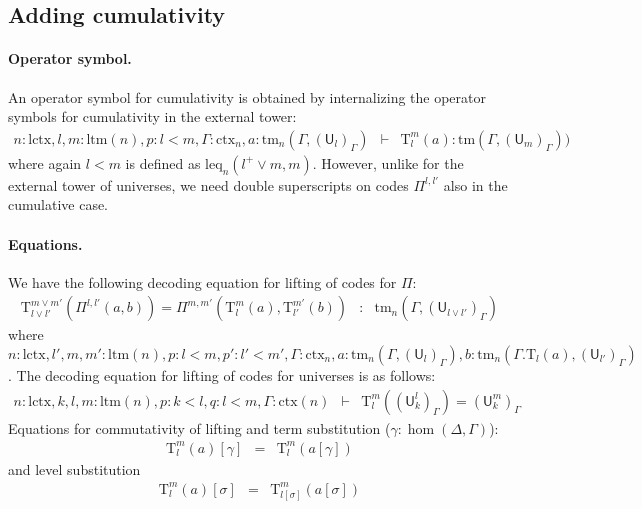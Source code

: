 \documentclass[11pt,a4paper]{article}
\theoremstyle{definition}
\newcommand{\UU}{\mathsf{U}}
\def\UU{\mathsf{U}}
\newcommand{\N}{\mathsf{N}}
\def\lctx{\mathrm{lctx}}
\def\ltm{\mathrm{ltm}}
\def\leq{\mathrm{leq}}
\newcommand{\ctx}{\mathrm{ctx}}
\newcommand{\tm}{\mathrm{tm}}
\def\U{\mathsf{U}}
\newcommand{\Ta}{\mathrm{T}}
\begin{document}
\subsection{Adding cumulativity} 
\paragraph{Operator symbol.}
An operator symbol for cumulativity is obtained by internalizing the operator symbols for cumulativity in the external tower:
\begin{eqnarray*}
n : \lctx, l,m : \ltm(n), p : l < m, \Gamma : \ctx_n, a : \tm_n(\Gamma,(\U_{l})_\Gamma) &\vdash& {\Ta^m_{l}}(a) : \tm(\Gamma,(\U_{m})_\Gamma))
\end{eqnarray*}
where again $l < m$ is defined as $\leq_n(l^+ \vee m, m)$. However, unlike for the external tower of universes, we need double superscripts on codes $\Pi^{l,l'}$ also in the cumulative case. 

\paragraph{Equations.}
We have the following decoding equation for lifting of codes for $\Pi$:
\begin{eqnarray*}
\Ta^{m \vee m'}_{l \vee l'}(\Pi^{l,l'}(a,b)) = \Pi^{m,m'}(\Ta^m_l(a),\Ta^{m'}_{l'}(b)) &:& \tm_n(\Gamma,(\UU_{l \vee l'})_\Gamma)
\end{eqnarray*}
where $n: \lctx,l',m,m' : \ltm(n), p: l < m, p': l' < m', \Gamma : \ctx_n, a : \tm_n(\Gamma,(\UU_l)_\Gamma), b : \tm_n(\Gamma.\Ta_l(a),(\UU_{l'})_\Gamma)$.
The decoding equation for lifting of codes for universes is as follows:
\begin{eqnarray*}
n : \lctx, k, l, m : \ltm(n), p : k < l, q : l < m, \Gamma : \ctx(n) &\vdash& \Ta^m_l((\UU^l_k)_\Gamma) = (\UU^m_k)_\Gamma
\end{eqnarray*}
Equations for commutativity of lifting and term substitution ($\gamma : \hom(\Delta,\Gamma)$):
\begin{eqnarray*}
\Ta^m_l(a) [ \gamma ] &=& \Ta^m_l(a[ \gamma ] )
\end{eqnarray*}
and level substitution
\begin{eqnarray*}
\Ta^m_l(a) [ \sigma ] &=& \Ta^m_{l[\sigma]}(a[ \sigma ] )
\end{eqnarray*}
\end{document}
